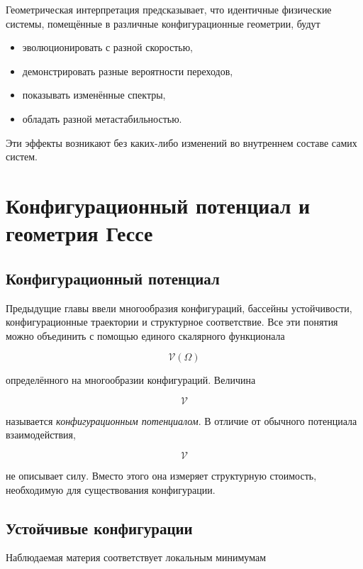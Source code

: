 Геометрическая интерпретация предсказывает, что идентичные физические системы, помещённые в различные конфигурационные геометрии, будут

\begin{itemize}

\item эволюционировать с разной скоростью,

\item демонстрировать разные вероятности переходов,

\item показывать изменённые спектры,

\item обладать разной метастабильностью.

\end{itemize}

Эти эффекты возникают без каких-либо изменений во внутреннем составе самих систем.

\chapter{Конфигурационный потенциал и геометрия Гессе}

\section{Конфигурационный потенциал}

Предыдущие главы ввели многообразия конфигураций, бассейны устойчивости, конфигурационные траектории и структурное соответствие. Все эти понятия можно объединить с помощью единого скалярного функционала

\[ \boxed{ \mathcal V(\Omega) } \]

определённого на многообразии конфигураций. Величина

\[ \mathcal V \]

называется \emph{конфигурационным потенциалом}. В отличие от обычного потенциала взаимодействия,

\[ \mathcal V \]

не описывает силу. Вместо этого она измеряет структурную стоимость, необходимую для существования конфигурации.

\section{Устойчивые конфигурации}

Наблюдаемая материя соответствует локальным минимумам

